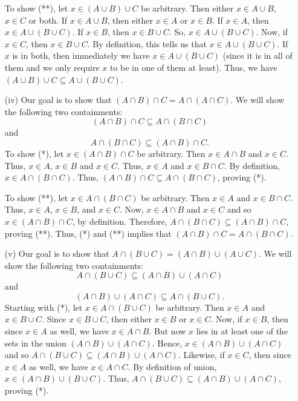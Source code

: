 \documentclass[a4paper]{article}
\begin{document}
\begin{enumerate}
        To show (**), let \( x \in (A \cup B) \cup C  \) be arbitrary. Then either \( x \in A \cup B \), \( x \in C  \) or both. If \( x \in A \cup B \), then either \( x \in A    \) or \( x \in B \). If \( x \in A  \), then \( x \in A \cup (B \cup C ) \). If \( x \in B \), then \( x \in B \cup C  \). So, \( x \in A \cup (B \cup C) \). Now, if \( x \in C  \), then \( x \in B \cup C  \). By definition, this tells us that \( x \in A \cup (B \cup C ) \). If \( x  \) is in both, then immediately we have \( x \in A \cup (B \cup C ) \) (since it is in all of them and we only require \( x  \) to be in one of them at least). Thus, we have \( (A \cup B) \cup C \subseteq A \cup (B \cup C ) \).
    
    \item[(iv)] Our goal is to show that \( (A \cap B) \cap C  = A \cap (A \cap C) \). We will show the following two containments:
        \[  (A \cap B) \cap C \subseteq  A \cap (B \cap C) \tag{*} \]
        and
        \[  A \cap (B \cap C) \subseteq  (A \cap B) \cap C.  \tag{**} \]
        To show (*), let \( x \in (A \cap B) \cap C  \) be arbitrary. Then \( x \in A \cap B \) and \( x \in C  \). Thus, \( x \in A  \), \( x \in B  \) and \( x \in C  \). Thus, \( x \in A  \) and \( x \in B \cap C  \). By definition, \( x \in A \cap (B \cap C) \). Thus, \( (A \cap B) \cap C \subseteq A \cap (B \cap C) \), proving (*).

        To show (**), let \( x \in A \cap (B \cap C)  \) be arbitrary. Then \( x \in A  \) and \( x \in B \cap C \). Thus, \( x \in A  \), \( x \in B  \), and \( x \in C  \). Now, \( x \in A \cap B  \) and \( x \in C  \) and so \( x \in (A \cap B) \cap C  \), by definition. Therefore, \( A \cap (B \cap C) \subseteq  (A \cap B) \cap C  \), proving (**). Thus, (*) and (**) implies that \( (A \cap B) \cap C = A \cap (B \cap C) \).
       
    \item[(v)] Our goal is to show that \( A \cap (B \cup C) = (A \cap B) \cup (A \cup C) \). We will show the following two containments:   
        \[  A \cap (B \cup C ) \subseteq  (A \cap B) \cup (A \cap C) \tag{*} \]
        and
        \[  (A \cap B) \cup (A \cap C) \subseteq A \cap (B \cup C). \tag{**} \]
        Starting with (*), let \( x \in A \cap (B \cup C) \) be arbitrary. Then \( x \in A  \) and \( x \in B \cup C \). Since \( x \in B \cup C  \), then either \( x \in B  \) or \( x \in C \). Now, if \( x \in B \), then since \( x \in A  \) as well, we have \( x \in A \cap B \). But now \( x  \) lies in at least one of the sets in the union \( (A \cap B) \cup (A \cap C) \). Hence, \( x \in (A \cap B) \cup (A \cap C) \) and so \( A \cap (B \cup C) \subseteq  (A \cap B) \cup (A \cap C) \). Likewise, if \( x \in C  \), then since \( x \in A  \) as well, we have \( x \in A \cap C  \). By definition of union, \( x \in (A \cap  B) \cup (B \cup C) \). Thus, \( A \cap (B \cup C) \subseteq (A \cap B) \cup (A \cap C)  \), proving (*).


\end{enumerate}
\end{document}
